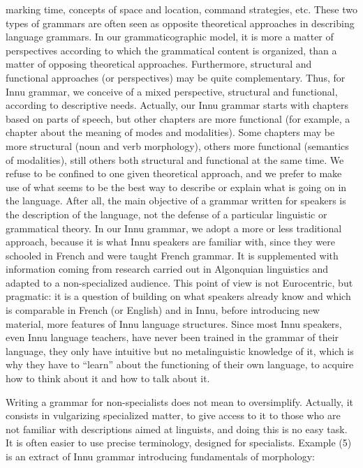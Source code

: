 marking time, concepts of space and location, command strategies, etc. These two types of grammars are often seen as opposite theoretical approaches in describing language grammars. In our grammaticographic model, it is more a matter of perspectives according to which the grammatical content is organized, than a matter of opposing theoretical approaches. Furthermore, structural and functional approaches (or perspectives) may be quite complementary. Thus, for Innu grammar, we conceive of a mixed perspective, structural and functional, according to descriptive needs. Actually, our Innu grammar starts with chapters based on parts of speech, but other chapters are more functional (for example, a chapter about the meaning of modes and modalities). Some chapters may be more structural (noun and verb morphology), others more functional (semantics of modalities), still others both structural and functional at the same time. We refuse to be confined to one given theoretical approach, and we prefer to make use of what seems to be the best way to describe or explain what is going on in the language. After all, the main objective of a grammar written for speakers is the description of the language, not the defense of a particular linguistic or grammatical theory. In our Innu grammar, we adopt a more or less traditional approach, because it is what Innu speakers are familiar with, since they were schooled in French and were taught French grammar. It is supplemented with information coming from research carried out in Algonquian linguistics and adapted to a non-specialized audience. This point of view is not Eurocentric, but pragmatic: it is a question of building on what speakers already know and which is comparable in French (or English) and in Innu, before introducing new material, more features of Innu language structures. Since most Innu speakers, even Innu language teachers, have never been trained in the grammar of their language, they only have intuitive but no metalinguistic knowledge of it, which is why they have to ``learn'' about the functioning of their own language, to acquire how to think about it and how to talk about it.

Writing a grammar for non-specialists does not mean to oversimplify. Actually, it consists in vulgarizing specialized matter, to give access to it to those who are not familiar with descriptions aimed at linguists, and doing this is no easy task. It is often easier to use precise terminology, designed for specialists. Example (5) is an extract of Innu grammar introducing fundamentals of morphology:
 


